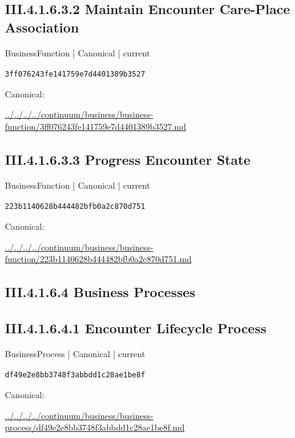 \documentclass[10pt,a4paper]{article}
\begin{document}
\subsection*{III.4.1.6.3.2 Maintain Encounter Care-Place Association}
\label{element-3ff076243fe141759e7d4401389b3527}
{\small BusinessFunction | Canonical | current}\par
\texttt{3ff076243fe141759e7d4401389b3527}\par
Canonical: \par
{\footnotesize\url{../../../../continuum/business/business-function/3ff076243fe141759e7d4401389b3527.md}}\par
\subsection*{III.4.1.6.3.3 Progress Encounter State}
\label{element-223b1140628b444482bfb0a2c870d751}
{\small BusinessFunction | Canonical | current}\par
\texttt{223b1140628b444482bfb0a2c870d751}\par
Canonical: \par
{\footnotesize\url{../../../../continuum/business/business-function/223b1140628b444482bfb0a2c870d751.md}}\par
\subsection*{III.4.1.6.4 Business Processes}
\subsection*{III.4.1.6.4.1 Encounter Lifecycle Process}
\label{element-df49e2e8bb3748f3abbdd1c28ae1be8f}
{\small BusinessProcess | Canonical | current}\par
\texttt{df49e2e8bb3748f3abbdd1c28ae1be8f}\par
Canonical: \par
{\footnotesize\url{../../../../continuum/business/business-process/df49e2e8bb3748f3abbdd1c28ae1be8f.md}}\par
\end{document}
